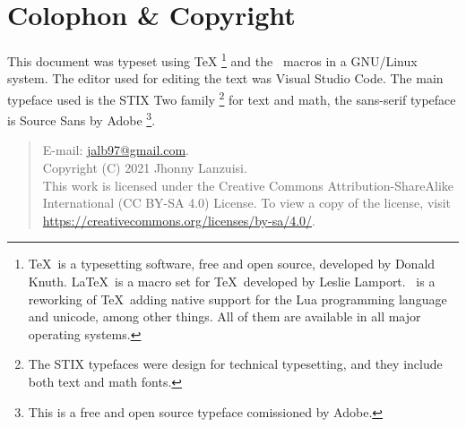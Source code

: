 \newpage
\section*{Colophon \& Copyright}
This document was typeset using \TeX%
\footnote{%
    \TeX\ is
    a typesetting software, free and open source,
    developed by Donald Knuth. \LaTeX\ is a macro
    set for \TeX\ developed by Leslie Lamport. \LuaTeX\ is
    a reworking of \TeX\ adding native support for the Lua
    programming language and unicode, among other things.
    All of them are available in all major
    operating systems.
}
and the \LaTeXe\ macros in a GNU/Linux system.
The editor used for editing the text was Visual Studio Code.%
The main typeface used is the STIX Two family%
\footnote{%
    The STIX typefaces were design for technical typesetting,
    and they include both text and math fonts.
}
for text and math,
the sans-serif typeface is Source Sans by Adobe%
\footnote{%
    This is a free and open source typeface comissioned by Adobe.
}.

\medskip
%
\begin{quote}
\sffamily\small
     E-mail: \url{jalb97@gmail.com}. \\
    Copyright (C) 2021 Jhonny Lanzuisi. \\
    This work is licensed under the Creative Commons Attri\-bu\-tion-Sha\-re\-Alike
    International (CC BY-SA 4.0)  License. To view a copy of the license,
    visit \url{https://creativecommons.org/licenses/by-sa/4.0/}.
\end{quote}
